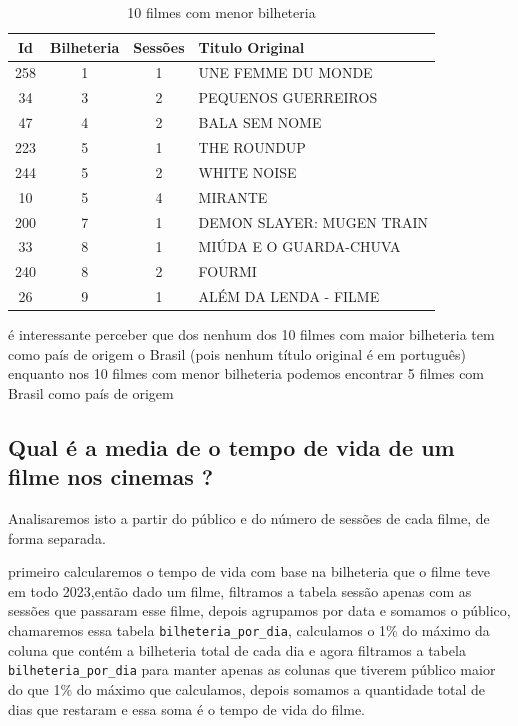 \documentclass[12pt, a4paper]{article}
\begin{document}
\begin{table}[h]
    \centering
    \begin{tabular}{c|c|c|l}
    \hline
    Id &	Bilheteria&	Sessões&	Titulo Original\\
    \hline
	258&	1&	1&	UNE FEMME DU MONDE\\
	34 &	3&	2&	PEQUENOS GUERREIROS\\
	47 &	4&	2&	BALA SEM NOME\\
    \hline
	223&	5&	1&	THE ROUNDUP\\
	244&	5&	2&	WHITE NOISE\\
	10 &	5&	4&	MIRANTE\\
    \hline
	200&	7&	1&	DEMON SLAYER: MUGEN TRAIN\\
	33 &	8&	1&	MIÚDA E O GUARDA-CHUVA\\
	240&	8&	2&	FOURMI\\
	26& 	9&	1&	ALÉM DA LENDA - FILME\\
    \end{tabular}
    \caption{10 filmes com menor bilheteria}
    \label{tab:menorbilheteria}
\end{table}

    é interessante perceber que dos nenhum dos 10 filmes com maior bilheteria tem como país de origem o Brasil (pois nenhum título original é em português) enquanto nos 10 filmes com menor bilheteria podemos encontrar 5 filmes com Brasil como país de origem

\newpage

\subsection{Qual é a media de o tempo de vida de um filme nos cinemas ?}

Analisaremos isto a partir do público e do número de sessões de cada filme, de forma separada.

primeiro calcularemos o tempo de vida com base na bilheteria que o filme teve em todo 2023,então dado um filme, filtramos a tabela sessão apenas com as sessões que passaram esse filme, depois agrupamos por data e somamos o público, chamaremos essa tabela \texttt{bilheteria\_por\_dia}, calculamos o 1\% do máximo da coluna que contém a bilheteria total de cada dia e agora filtramos a tabela \texttt{bilheteria\_por\_dia} para manter apenas as colunas que tiverem público maior do que 1\% do máximo que calculamos, depois somamos a quantidade total de dias que restaram e essa soma é o tempo de vida do filme.
\end{document}
